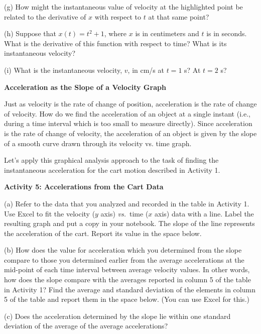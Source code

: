 (g) How might the instantaneous value of velocity at the highlighted point be
related to the derivative of $x$ with respect to $t$ at that same point?
\vspace{20mm}

(h) Suppose that $x(t) = t^{2} + 1$, where $x$ is in centimeters and $t$ is
in seconds. What is the derivative of this function with respect to time? What
is its instantaneous velocity?
\vspace{20mm}

(i) What is the instantaneous velocity, $v$, in cm/s at $t = 1$ s? At 
$t = 2$ s?
\answerspace{20mm}

\pagebreak[2]
\textbf{Acceleration as the Slope of a Velocity Graph} 

Just as velocity is the rate of change of position, acceleration is the rate
of change of velocity. How do we find the acceleration of an object at a single
instant (i.e., during a time interval which is too small to measure directly).
Since acceleration is the rate of change of velocity, the acceleration of an
object is given by the slope of a smooth curve drawn through its velocity vs.
time graph.

Let's apply this graphical analysis approach to the task of finding the instantaneous
acceleration for the cart motion described in Activity 1.

\textbf{Activity 5: Accelerations from the Cart Data }

(a) Refer to the data that you analyzed and recorded in the table in Activity
1. Use Excel to fit the velocity ($y$ axis) \textit{vs.}~time ($x$ axis) data with
a line. Label the resulting graph and put a copy in your notebook. The slope
of the line represents the acceleration of the cart. Report its value in the
space below.
\vspace{10mm}

(b) How does the value for acceleration which you determined from the slope
compare to those you determined earlier from the average accelerations at the
mid-point of each time interval between average velocity values. In other words,
how does the slope compare with the averages reported in column 5 of the table
in Activity 1? Find the average and standard deviation of the elements in column
5 of the table and report them in the space below. (You can use Excel
for this.)
\vspace{20mm}

(c) Does the acceleration determined by the slope lie within one standard deviation
of the average of the average accelerations? 

